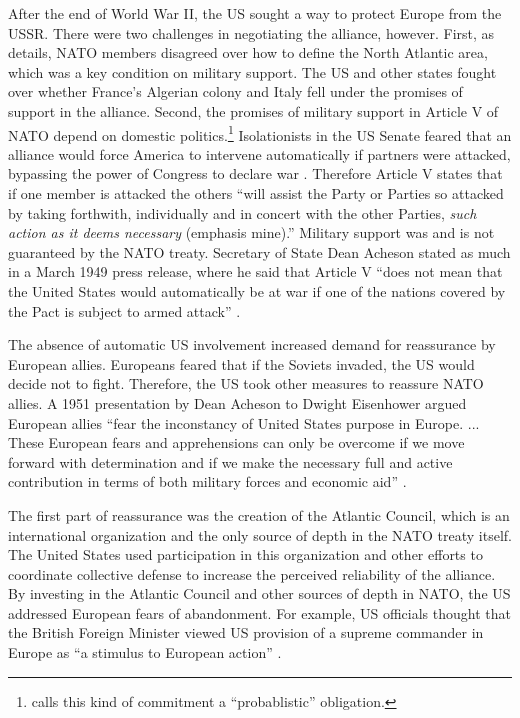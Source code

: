 \documentclass[12pt]{article}
\begin{document}
After the end of World War II, the US sought a way to protect Europe from the USSR. 
There were two challenges in negotiating the alliance, however.
First, as \citet{Poast2019a} details, NATO members disagreed over how to define the North Atlantic area, which was a key condition on military support. 
The US and other states fought over whether France's Algerian colony and Italy fell under the promises of support in the alliance. 
Second, the promises of military support in Article V of NATO depend on domestic politics.\footnote{\citet{Benson2012} calls this kind of commitment a ``probablistic'' obligation.} 
Isolationists in the US Senate feared that an alliance would force America to intervene automatically if partners were attacked, bypassing the power of Congress to declare war \citep[pg. 280-1]{Acheson1969}.
Therefore Article V states that if one member is attacked the others ``will assist the Party or Parties so attacked by taking forthwith, individually and in concert with the other Parties, \emph{such action as it deems necessary} (emphasis mine).'' 
Military support was and is not guaranteed by the NATO treaty. 
Secretary of State Dean Acheson stated as much in a March 1949 press release, where he said that Article V ``does not mean that the United States would automatically be at war if one of the nations covered by the Pact is subject to armed attack'' \citep{Acheson1949}. 


The absence of automatic US involvement increased demand for reassurance by European allies. 
Europeans feared that if the Soviets invaded, the US would decide not to fight. 
Therefore, the US took other measures to reassure NATO allies. 
A 1951 presentation by Dean Acheson to Dwight Eisenhower argued European allies ``fear the inconstancy of United States purpose in Europe. ... These European fears and apprehensions can only be overcome if we move forward with determination and if we make the necessary full and active contribution in terms of both military forces and economic aid'' \citep[pg. 3]{Acheson1951}. 


The first part of reassurance was the creation of the Atlantic Council, which is an international organization and the only source of depth in the NATO treaty itself. 
The United States used participation in this organization and other efforts to coordinate collective defense to increase the perceived reliability of the alliance. 
By investing in the Atlantic Council and other sources of depth in NATO, the US addressed European fears of abandonment. 
For example, US officials thought that the British Foreign Minister viewed US provision of a supreme commander in Europe as ``a stimulus to European action'' \citep{Acheson1950}. 
\end{document}
